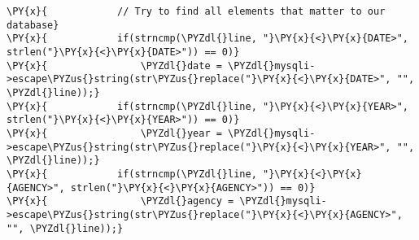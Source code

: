 \begin{Verbatim}[commandchars=\\\{\}]
\PY{x}{            // Try to find all elements that matter to our database}
\PY{x}{            if(strncmp(\PYZdl{}line, "}\PY{x}{<}\PY{x}{DATE>", strlen("}\PY{x}{<}\PY{x}{DATE>")) == 0)}
\PY{x}{                \PYZdl{}date = \PYZdl{}mysqli->escape\PYZus{}string(str\PYZus{}replace("}\PY{x}{<}\PY{x}{DATE>", "", \PYZdl{}line));}
\PY{x}{            if(strncmp(\PYZdl{}line, "}\PY{x}{<}\PY{x}{YEAR>", strlen("}\PY{x}{<}\PY{x}{YEAR>")) == 0)}
\PY{x}{                \PYZdl{}year = \PYZdl{}mysqli->escape\PYZus{}string(str\PYZus{}replace("}\PY{x}{<}\PY{x}{YEAR>", "", \PYZdl{}line));}
\PY{x}{            if(strncmp(\PYZdl{}line, "}\PY{x}{<}\PY{x}{AGENCY>", strlen("}\PY{x}{<}\PY{x}{AGENCY>")) == 0)}
\PY{x}{                \PYZdl{}agency = \PYZdl{}mysqli->escape\PYZus{}string(str\PYZus{}replace("}\PY{x}{<}\PY{x}{AGENCY>", "", \PYZdl{}line));}
\end{Verbatim}

